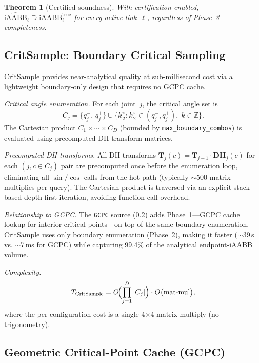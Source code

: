 \documentclass[journal]{IEEEtran}
\newtheorem{theorem}{Theorem}
\newcommand{\iAABB}{\text{iAABB}}
\newcommand{\bT}{\mathbf{T}}
\begin{document}
\begin{theorem}[Certified soundness]\label{thm:cert_sound}
With certification enabled, $\widehat{\iAABB}_\ell \supseteq
\iAABB^{\mathrm{true}}_\ell$ for every active link~$\ell$,
regardless of Phase~3 completeness.
\end{theorem}

\subsection{CritSample: Boundary Critical Sampling}%
\label{sec:critsample}

CritSample provides near-analytical quality at sub-millisecond cost
via a lightweight boundary-only design that requires
no GCPC cache.

\emph{Critical angle enumeration.}
For each joint~$j$, the critical angle set is
\begin{equation}
  C_j = \{q_j^-,\, q_j^+\}
  \cup \bigl\{ k\tfrac{\pi}{2} : k\tfrac{\pi}{2} \in (q_j^-,q_j^+),\;
  k \in \mathbb{Z} \bigr\}.
\end{equation}
The Cartesian product $C_1 \times \cdots \times C_D$
(bounded by \texttt{max\_boundary\_combos}) is evaluated
using precomputed DH transform matrices.

\emph{Precomputed DH transforms.}
All DH transforms $\bT_j(c) = \bT_{j-1} \cdot \mathbf{DH}_j(c)$ for
each $(j, c \in C_j)$ pair are precomputed once before the
enumeration loop, eliminating all $\sin/\cos$ calls from the
hot path (typically $\sim$500 matrix multiplies per query).
The Cartesian product is traversed via an explicit stack-based
depth-first iteration, avoiding function-call overhead.

\emph{Relationship to GCPC.}
The \texttt{GCPC} source (\cref{sec:gcpc}) adds Phase~1---GCPC
cache lookup for interior critical points---on top of the same
boundary enumeration.
CritSample uses only boundary enumeration (Phase~2),
making it faster ($\sim$39\,\textmu s vs.
$\sim$7\,ms for GCPC) while capturing 99.4\% of
the analytical endpoint-iAABB volume.

\emph{Complexity.}
\begin{equation}
  T_\text{CritSample}
  = O\!\Bigl(\prod_{j=1}^{D} |C_j|\Bigr)
  \cdot O\bigl(\text{mat-mul}\bigr),
\end{equation}
where the per-configuration cost is a single 4$\times$4 matrix
multiply (no trigonometry).

\subsection{Geometric Critical-Point Cache (GCPC)}\label{sec:gcpc}
\end{document}
